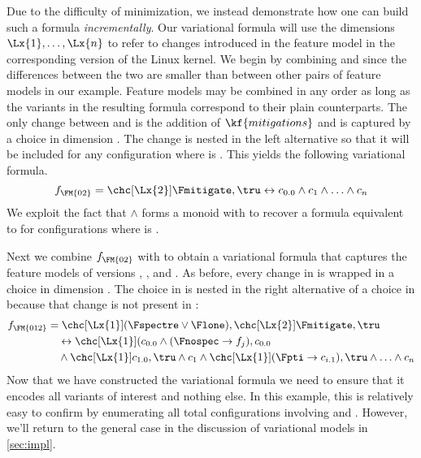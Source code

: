 Due to the difficulty of minimization, we instead demonstrate how one can build
such a formula \emph{incrementally}.
%
Our variational formula will use the dimensions $\Lx{1},\ldots,\Lx{n}$ to refer
to changes introduced in the feature model in the corresponding version of the Linux
kernel.
%
We begin by combining  and  since the differences between the two
are smaller than between other pairs of feature models in our example. Feature
models may be combined in any order as long as the variants in the resulting
formula correspond to their plain counterparts. The only change between 
and  is the addition of $\kf{mitigations}$ and is captured by a choice in
dimension . The change is nested in the left alternative so that it will
be included for any configuration where  is \true. This yields the
following variational formula.
%
\begin{equation*}
  f_{\FM{02}} =
  \chc[\Lx{2}]{\Fmitigate,\tru}
  \leftrightarrow c_{0.0} \wedge c_{1} \wedge \ldots \wedge c_{n}
\end{equation*}
%
%
We exploit the fact that $\wedge$ forms a monoid with \tru{} to recover a
formula equivalent to  for configurations where  is \false.

Next we combine $f_{\text{\FM{02}}}$ with  to obtain a variational formula
that captures the feature models of versions , , and . As
before, every change in  is wrapped in a choice in dimension . The
choice in  is nested in the right alternative of a choice in 
because that change is not present in :
%
\begin{align*}
  f_{\FM{012}}
    &= \chc[\Lx{1}]{(\Fspectre \vee \Flone),
         \chc[\Lx{2}]{\Fmitigate,\tru}} \\
    &\quad \leftrightarrow
      \chc[\Lx{1}]{(c_{0.0} \wedge (\Fnospec \rightarrow f_j), c_{0.0}} \\
    &\quad \wedge
      \chc[\Lx{1}]{c_{1.0},\tru} \wedge c_1 \wedge
        \chc[\Lx{1}]{(\Fpti \rightarrow c_{i.1}), \tru} \wedge \ldots \wedge c_{n}
\end{align*}
%
%
Now that we have constructed the variational formula we need to ensure that it
encodes all variants of interest and nothing else. In this example, this is
relatively easy to confirm by enumerating all total configurations involving
 and . However, we'll return to the general case in the discussion
of variational models in \autoref{sec:impl}.

